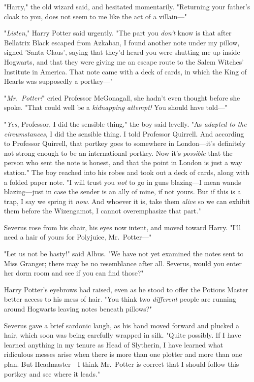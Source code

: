 "Harry," the old wizard said, and hesitated momentarily. "Returning your 
father's cloak to you, does not seem to me like the act of a villain---"

"\emph{Listen}," Harry Potter said urgently. "The part you \emph{don't} know is 
that after Bellatrix Black escaped from Azkaban, I found another note under my 
pillow, signed 'Santa Claus', saying that they'd heard you were shutting me up 
inside Hogwarts, and that they were giving me an escape route to the Salem 
Witches' Institute in America. That note came with a deck of cards, in which 
the King of Hearts was supposedly a portkey---"

"\emph{Mr.~Potter!}" cried Professor McGonagall, she hadn't even thought before 
she spoke. "That could well be a \emph{kidnapping attempt!} You should have 
told---"

"\emph{Yes}, Professor, I did the sensible thing," the boy said levelly. "As 
\emph{adapted to the circumstances}, I did the sensible thing. I told Professor 
Quirrell. And according to Professor Quirrell, that portkey goes to somewhere 
in London---it's definitely not strong enough to be an international portkey. 
Now it's \emph{possible} that the person who sent the note is honest, and that 
the point in London is just a way station." The boy reached into his robes and 
took out a deck of cards, along with a folded paper note. "I will trust you 
\emph{not} to go in guns blazing---I mean wands blazing---just in case the 
sender is an ally of mine, if not yours. But if this is a trap, I say we spring 
it \emph{now}. And whoever it is, take them \emph{alive} so we can exhibit them 
before the Wizengamot, I cannot overemphasize that part."

Severus rose from his chair, his eyes now intent, and moved toward Harry. "I'll 
need a hair of yours for Polyjuice, Mr.~Potter---"

"Let us not be hasty!" said Albus. "We have not yet examined the notes sent to 
Miss Granger; there may be no resemblance after all. Severus, would you enter 
her dorm room and see if you can find those?"

Harry Potter's eyebrows had raised, even as he stood to offer the Potions 
Master better access to his mess of hair. "You think two \emph{different} 
people are running around Hogwarts leaving notes beneath pillows?"

Severus gave a brief sardonic laugh, as his hand moved forward and plucked a 
hair, which soon was being carefully wrapped in silk. "Quite possibly. If I 
have learned anything in my tenure as Head of Slytherin, I have learned what 
ridiculous messes arise when there is more than one plotter and more than one 
plan. But Headmaster---I think Mr.~Potter is correct that I should follow this 
portkey and see where it leads."

